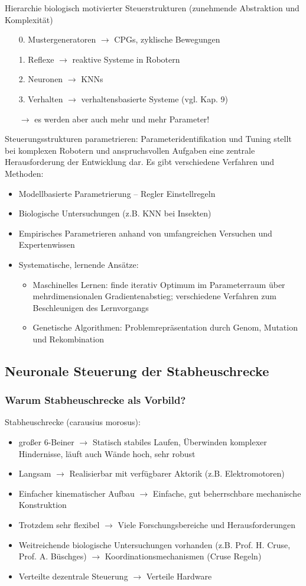 Hierarchie biologisch motivierter Steuerstrukturen (zunehmende Abstraktion und Komplexität)
\begin{itemize}
\item[0.] Mustergeneratoren $\rightarrow$ CPGs, zyklische Bewegungen
\item[1.] Reflexe $\rightarrow$ reaktive Systeme in Robotern
\item[2.] Neuronen $\rightarrow$ KNNs
\item[3.] Verhalten $\rightarrow$ verhaltensbasierte Systeme (vgl. Kap. 9)
\item[$\rightarrow$] es werden aber auch mehr und mehr Parameter!
\end{itemize}
Steuerungsstrukturen parametrieren: Parameteridentifikation und Tuning stellt bei komplexen
Robotern und anspruchsvollen Aufgaben eine zentrale Herausforderung der Entwicklung dar. 
Es gibt verschiedene Verfahren und Methoden:
\begin{itemize}
\item Modellbasierte Parametrierung – \glqq Regler Einstellregeln\grqq
\item Biologische Untersuchungen (z.B. KNN bei Insekten)
\item Empirisches Parametrieren anhand von umfangreichen Versuchen und Expertenwissen
\item Systematische, lernende Ansätze: 
\begin{itemize}
\item Maschinelles Lernen: finde iterativ Optimum im Parameterraum über mehrdimensionalen Gradientenabstieg; verschiedene Verfahren zum Beschleunigen des Lernvorgangs
\item Genetische Algorithmen: Problemrepräsentation durch \glqq Genom\grqq, Mutation und Rekombination
\end{itemize}
\end{itemize}
\subsection{Neuronale Steuerung der Stabheuschrecke}
\subsubsection{Warum Stabheuschrecke als Vorbild?}
Stabheuschrecke (carausius morosus):
\begin{itemize}
\item großer 6-Beiner $\rightarrow$ Statisch stabiles Laufen, Überwinden komplexer Hindernisse, läuft auch Wände hoch, sehr robust
\item Langsam $\rightarrow$ Realisierbar mit verfügbarer Aktorik (z.B. Elektromotoren)
\item Einfacher kinematischer Aufbau $\rightarrow$ Einfache, gut beherrschbare mechanische Konstruktion
\item Trotzdem sehr flexibel $\rightarrow$ Viele Forschungsbereiche und Herausforderungen
\item Weitreichende biologische Untersuchungen vorhanden (z.B. Prof. H. Cruse, Prof. A. Büschges) $\rightarrow$ Koordinationsmechanismen (\glqq Cruse Regeln\grqq)
\item Verteilte dezentrale Steuerung $\rightarrow$ Verteile Hardware
\end{itemize}
